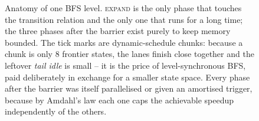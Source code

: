 {\begin{figure}[tb]
\caption{Anatomy of one BFS level.  \textsc{expand} is the only phase that
touches the transition relation and the only one that runs for a long time; the
three phases after the barrier exist purely to keep memory bounded.  The tick
marks are dynamic-schedule chunks: because a chunk is only $8$ frontier states,
the lanes finish close together and the leftover \emph{tail idle} is small --
it is the price of level-synchronous BFS, paid deliberately in exchange for a
smaller state space.  Every phase after the barrier was itself parallelised or
given an amortised trigger, because by Amdahl's law each one caps the
achievable speedup independently of the others.}
\label{fig:level}
\end{figure}}
